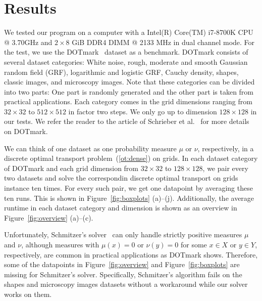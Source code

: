\documentclass[a4paper,UKenglish,cleveref, autoref, thm-restate]{lipics-v2021}
\begin{document}
\section{Results}\label{sec:res}
We tested our program on a computer with a Intel(R) Core(TM) i7-8700K CPU @ 3.70GHz and $2 \times 8$ GiB DDR4 DIMM @ 2133 MHz in dual channel mode.
For the test, we use the DOTmark~\cite{schrieber2017dotmark} dataset as a benchmark.
DOTmark consists of several dataset categories: White noise, rough, moderate and smooth Gaussian random field (GRF), logarithmic and logistic GRF, Cauchy density, shapes, classic images, and microscopy images.
Note that these categories can be divided into two parts: One part is randomly generated and the other part is taken from practical applications.
Each category comes in the grid dimensions ranging from $32 \times 32$ to $512 \times 512$ in factor two steps.
We only go up to dimension $128 \times 128$ in our tests.
We refer the reader to the article of Schrieber et al.~\cite{schrieber2017dotmark} for more details on DOTmark.

We can think of one dataset as one probability measure $\mu$ or $\nu$, respectively, in a discrete optimal transport problem~(\ref{ot:dense}) on grids.
In each dataset category of DOTmark and each grid dimension from $32 \times 32$ to $128 \times 128$, we pair every two datasets and solve the correspondin discrete optimal transport on grids instance ten times.
For every such pair, we get one datapoint by averaging these ten runs.
This is shown in Figure~\ref{fig:boxplots} (a)--(j).
Additionally, the average runtime in each dataset category and dimension is shown as an overview in Figure~\ref{fig:overview} (a)--(c).

Unfortunately, Schmitzer's solver~\cite{schmitzer2016sparse} can only handle strictly positive measures $\mu$ and $\nu$, although measures with $\mu(x)=0$ or $\nu(y)=0$ for some $x \in X$ or $y \in Y$, respectively, are common in practical applications as DOTmark shows.
Therefore, some of the datapoints in Figure~\ref{fig:overview} and Figure~\ref{fig:boxplots} are missing for Schmitzer's solver.
Specifically, Schmitzer's algorithm fails on the shapes and microscopy images datasets without a workaround while our solver works on them.
\end{document}
